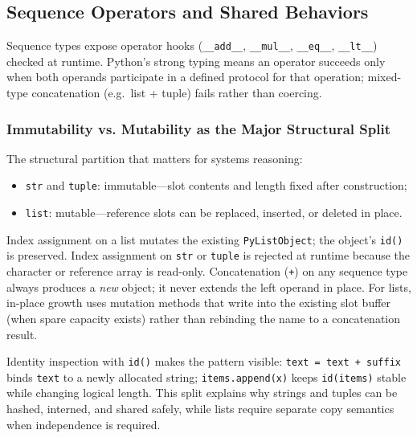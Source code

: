 \subsection{Sequence Operators and Shared Behaviors}

Sequence types expose operator hooks (\texttt{\_\_add\_\_}, \texttt{\_\_mul\_\_}, \texttt{\_\_eq\_\_}, \texttt{\_\_lt\_\_}) checked at runtime. Python's strong typing means an operator succeeds only when both operands participate in a defined protocol for that operation; mixed-type concatenation (e.g.\ list + tuple) fails rather than coercing.

\subsubsection{Immutability vs. Mutability as the Major Structural Split}

The structural partition that matters for systems reasoning:

\begin{itemize}
    \item \texttt{str} and \texttt{tuple}: immutable---slot contents and length fixed after construction;
    \item \texttt{list}: mutable---reference slots can be replaced, inserted, or deleted in place.
\end{itemize}

Index assignment on a list mutates the existing \texttt{PyListObject}; the object's \texttt{id()} is preserved. Index assignment on \texttt{str} or \texttt{tuple} is rejected at runtime because the character or reference array is read-only. Concatenation (\texttt{+}) on any sequence type always produces a \emph{new} object; it never extends the left operand in place. For lists, in-place growth uses mutation methods that write into the existing slot buffer (when spare capacity exists) rather than rebinding the name to a concatenation result.

Identity inspection with \texttt{id()} makes the pattern visible: \texttt{text = text + suffix} binds \texttt{text} to a newly allocated string; \texttt{items.append(x)} keeps \texttt{id(items)} stable while changing logical length. This split explains why strings and tuples can be hashed, interned, and shared safely, while lists require separate copy semantics when independence is required.
